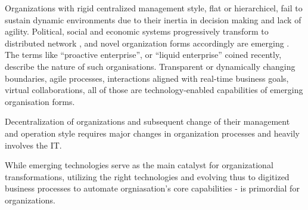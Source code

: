 Organizations with rigid centralized management style, flat or hierarchicel, fail to sustain dynamic environments due to their inertia in decision making and lack of agility. Political, social and economic systems progressively transform to distributed network , and novel organization forms accordingly are emerging \cite{bowens}. The terms like “proactive enterprise”, or “liquid enterprise” coined recently, describe  the nature of such organisations. Transparent or dynamically changing boundaries, agile processes, interactions aligned with real-time business goals, virtual collaborations,   all of those are technology-enabled capabilities of emerging organisation forms.

Decentralization of organizations and subsequent change
of their management and operation style requires major changes in organization processes and heavily involves the IT.

 While emerging technologies serve as the main catalyst for organizational transformations, utilizing the right technologies and evolving thus to digitized business processes to automate orgniasation’s core capabilities \cite{ross2006} - is primordial for organizations. 

